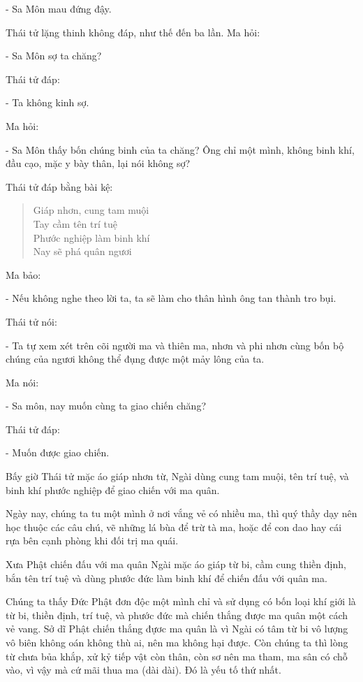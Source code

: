 \documentclass[
  12pt,
  oneside]{book}
\begin{document}
- Sa Môn mau đứng đậy.

Thái tử lặng thinh không đáp, như thế đến ba lần. Ma hỏi:

- Sa Môn sợ ta chăng?

Thái tử đáp:

- Ta không kinh sợ.

Ma hỏi:

- Sa Môn thấy bốn chúng binh của ta chăng? Ông chỉ một mình, không binh khí, đầu cạo, mặc y bày thân, lại nói không sợ?

Thái tử đáp bằng bài kệ:

\begin{quote}
Giáp nhơn, cung tam muội\\
Tay cầm tên trí tuệ\\
Phước nghiệp làm binh khí\\
Nay sẽ phá quân ngươi
\end{quote}

Ma bảo:

- Nếu không nghe theo lời ta, ta sẽ làm cho thân hình ông tan thành tro bụi.

Thái tử nói:

- Ta tự xem xét trên cõi người ma và thiên ma, nhơn và phi nhơn cùng bốn bộ chúng của ngươi không thể đụng được một mảy lông của ta.

Ma nói:

- Sa môn, nay muốn cùng ta giao chiến chăng?

Thái tử đáp:

- Muốn được giao chiến.

Bấy giờ Thái tử mặc áo giáp nhơn từ, Ngài dùng cung tam muội, tên trí tuệ, và binh khí phước nghiệp để giao chiến với ma quân.

Ngày nay, chúng ta tu một mình ở nơi vắng vẻ có nhiều ma, thì quý thầy dạy nên học thuộc các câu chú, vẽ những lá bùa để trừ tà ma, hoặc để con dao hay cái rựa bên cạnh phòng khi đối trị ma quái.

Xưa Phật chiến đấu với ma quân Ngài mặc áo giáp từ bi, cầm cung thiền định, bắn tên trí tuệ và dùng phước đức làm binh khí để chiến đấu với quân ma.

Chúng ta thấy Đức Phật đơn độc một mình chỉ và sử dụng có bốn loại khí giới là từ bi, thiền định, trí tuệ, và phước đức mà chiến thắng được ma quân một cách vẻ vang. Sở dĩ Phật chiến thắng đựơc ma quân là vì Ngài có tâm từ bi vô lượng vô biên không oán không thù ai, nên ma không hại được. Còn chúng ta thì lòng từ chưa bủa khắp, xử kỷ tiếp vật còn thân, còn sơ nên ma tham, ma sân có chỗ vào, vì vậy mà cứ mãi thua ma (dài dài). Đó là yếu tố thứ nhất.
\end{document}
